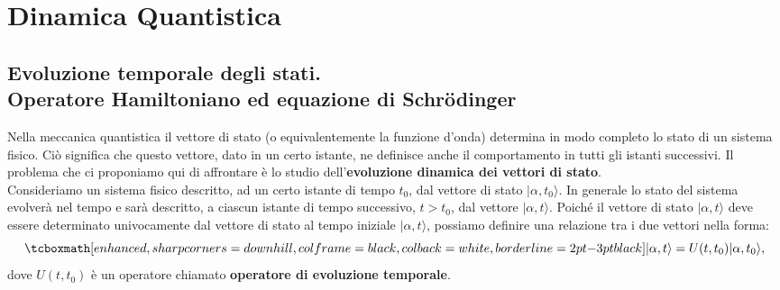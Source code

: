 \documentclass[a4paper,12pt,oneside]{book}
\newcommand*{\myfont}{\fontfamily{ppl}\selectfont}
\begin{document}
\fancypagestyle{plain}{%
\fancyhf{} %
\fancyfoot[C]{\bfseries \myfont{\thepage}} %
\renewcommand{\headrulewidth}{0pt}
\renewcommand{\footrulewidth}{0pt}}

\fancypagestyle{VS}{
\headheight = 15pt
\lhead[\myfont{\textit{\textbf{\thechapter\nouppercase{\leftmark}}}}]{\myfont{\textit{\textbf{\nouppercase{\leftmark}}}}}
\chead[]{}
\rhead[\myfont{\textbf{\thepage}}]{\myfont{\textbf{\thepage}}}

\lfoot[]{}
\cfoot[]{}
\rfoot[]{}
}



\pagestyle{VS}
\setcounter{chapter}{7}
\setcounter{page}{91}
\chapter{Dinamica Quantistica}
\section[Evoluzione temporale degli stati]{Evoluzione temporale degli stati.\\Operatore Hamiltoniano ed equazione di Schr\"{o}dinger}
Nella meccanica quantistica il vettore di stato (o equivalentemente la funzione d'onda) determina in modo completo lo stato di un sistema fisico. Ciò significa che questo vettore, dato in un certo istante, ne definisce anche il comportamento in tutti gli istanti successivi. Il problema che ci proponiamo qui di affrontare è lo studio dell'\textbf{evoluzione dinamica dei vettori di stato}.\\

Consideriamo un sistema fisico descritto, ad un certo istante di tempo $t_0$, dal vettore di stato $\vert \alpha, t_0 \rangle$. In generale lo stato del sistema evolverà nel tempo e sarà descritto, a ciascun istante di tempo successivo, $t>t_0$, dal vettore $\vert \alpha, t\rangle$. Poiché il vettore di stato $\vert \alpha, t \rangle$ deve essere determinato univocamente dal vettore di stato al tempo iniziale $\vert \alpha, t \rangle$, possiamo definire una relazione tra i due vettori nella forma:
	\begin{equation}
		\tcboxmath[enhanced, sharp corners=downhill, colframe=black, colback=white, borderline={2pt}{-3pt}{black}]{	
			\vert \alpha, t \rangle = U(t,t_0)\vert \alpha, t_0 \rangle,
			}
	\end{equation}
dove $U(t,t_0)$ è un operatore chiamato \textbf{operatore di evoluzione temporale}.\\
\end{document}
